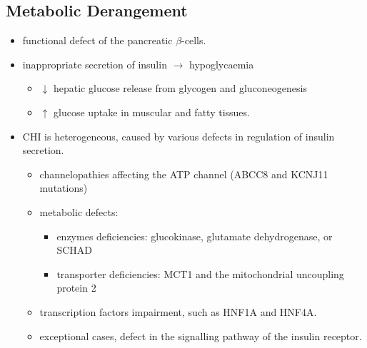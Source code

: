 \documentclass{scrartcl}
\begin{document}
\subsection{Metabolic Derangement}
\label{sec:org88cffe9}
\begin{itemize}
\item functional defect of the pancreatic \(\beta\)-cells.
\item inappropriate secretion of insulin \(\to\) hypoglycaemia
\begin{itemize}
\item \(\downarrow\) hepatic glucose release from glycogen and gluconeogenesis
\item \(\uparrow\) glucose uptake in muscular and fatty tissues.
\end{itemize}
\item CHI is heterogeneous, caused by various defects in regulation of insulin secretion.
\begin{itemize}
\item channelopathies affecting the ATP channel (ABCC8 and KCNJ11 mutations)
\item metabolic defects:
\begin{itemize}
\item enzymes deficiencies: glucokinase, glutamate dehydrogenase, or SCHAD
\item transporter deficiencies: MCT1 and the mitochondrial uncoupling protein 2
\end{itemize}
\item transcription factors impairment, such as HNF1A and HNF4A.
\item exceptional cases, defect in the signalling pathway of the insulin
receptor.
\end{itemize}
\end{itemize}
\end{document}
